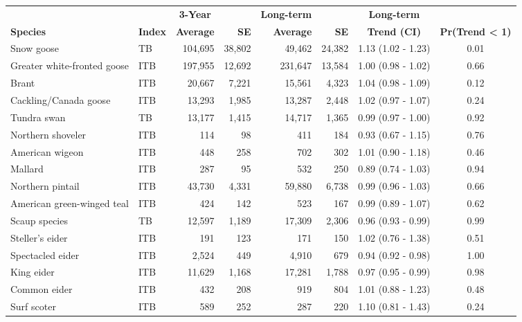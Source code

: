\documentclass[
]{article}
\begin{document}
\begin{longtable}[t]{llrrrrcc}
\\
\toprule
\multicolumn{1}{c}{\textbf{ }} & \multicolumn{1}{c}{\textbf{ }} & \multicolumn{1}{c}{\textbf{3-Year}} & \multicolumn{1}{c}{\textbf{ }} & \multicolumn{1}{c}{\textbf{Long-term}} & \multicolumn{1}{c}{\textbf{ }} & \multicolumn{1}{c}{\textbf{Long-term}} & \multicolumn{1}{c}{\textbf{ }} \\
\cmidrule(l{3pt}r{3pt}){3-3} \cmidrule(l{3pt}r{3pt}){5-5} \cmidrule(l{3pt}r{3pt}){7-7}
\textbf{Species} & \textbf{Index} & \textbf{Average} & \textbf{SE} & \textbf{Average} & \textbf{SE} & \textbf{Trend (CI)} & \textbf{Pr(Trend < 1)}\\
\midrule
Snow goose & TB & 104,695 & 38,802 & 49,462 & 24,382 & 1.13 (1.02 - 1.23) & 0.01\\
Greater white-fronted goose & ITB & 197,955 & 12,692 & 231,647 & 13,584 & 1.00 (0.98 - 1.02) & 0.66\\
Brant & ITB & 20,667 & 7,221 & 15,561 & 4,323 & 1.04 (0.98 - 1.09) & 0.12\\
Cackling/Canada goose & ITB & 13,293 & 1,985 & 13,287 & 2,448 & 1.02 (0.97 - 1.07) & 0.24\\
Tundra swan & TB & 13,177 & 1,415 & 14,717 & 1,365 & 0.99 (0.97 - 1.00) & 0.92\\
\addlinespace
Northern shoveler & ITB & 114 & 98 & 411 & 184 & 0.93 (0.67 - 1.15) & 0.76\\
American wigeon & ITB & 448 & 258 & 702 & 302 & 1.01 (0.90 - 1.18) & 0.46\\
Mallard & ITB & 287 & 95 & 532 & 250 & 0.89 (0.74 - 1.03) & 0.94\\
Northern pintail & ITB & 43,730 & 4,331 & 59,880 & 6,738 & 0.99 (0.96 - 1.03) & 0.66\\
American green-winged teal & ITB & 424 & 142 & 523 & 167 & 0.99 (0.89 - 1.07) & 0.62\\
\addlinespace
Scaup species & TB & 12,597 & 1,189 & 17,309 & 2,306 & 0.96 (0.93 - 0.99) & 0.99\\
Steller's eider & ITB & 191 & 123 & 171 & 150 & 1.02 (0.76 - 1.38) & 0.51\\
Spectacled eider & ITB & 2,524 & 449 & 4,910 & 679 & 0.94 (0.92 - 0.98) & 1.00\\
King eider & ITB & 11,629 & 1,168 & 17,281 & 1,788 & 0.97 (0.95 - 0.99) & 0.98\\
Common eider & ITB & 432 & 208 & 919 & 804 & 1.01 (0.88 - 1.23) & 0.48\\
\addlinespace
Surf scoter & ITB & 589 & 252 & 287 & 220 & 1.10 (0.81 - 1.43) & 0.24\\

\end{longtable}
\end{document}
